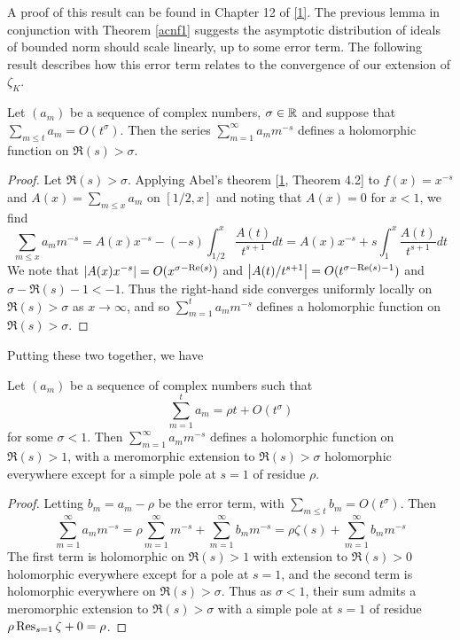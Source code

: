 \documentclass[11pt]{report}
\begin{document}
A proof of this result can be found in Chapter 12 of \hyperlink{apostol}{[1]}. The previous lemma in conjunction with Theorem \ref{acnf1} suggests the asymptotic distribution of ideals of bounded norm should scale linearly, up to some error term. The following result describes how this error term relates to the convergence of our extension of $\zeta_K$.
\begin{lemma}
    Let $(a_m)$ be a sequence of complex numbers, $\sigma \in \mathbb{R}$ and suppose that $\sum_{m \leq t} a_m = O(t^\sigma)$. Then the series $\sum_{m = 1}^\infty a_mm^{-s}$ defines a holomorphic function on $\Re(s) > \sigma$.
\end{lemma}
\begin{proof}
    Let $\Re(s) > \sigma$. Applying Abel's theorem [\hyperlink{apostol}{1}, Theorem 4.2] to $f(x) = x^{-s}$ and $A(x) = \sum_{m \leq x}a_m$ on $[1/2, x]$ and noting that $A(x) = 0$ for $x < 1$, we find
    $$
        \sum_{m \leq x}a_mm^{-s} = A(x)x^{-s} - (-s)\int_{1/2}^x \frac{A(t)}{t^{s + 1}}dt = A(x)x^{-s} + s\int_1^x\frac{A(t)}{t^{s + 1}}dt
    $$
    We note that $\left| A(x)x^{-s} \right| = O(x^{\sigma - \text{Re}(s)})$ and $\left| A(t)/t^{s + 1} \right| = O(t^{\sigma - \text{Re}(s) - 1})$ and $\sigma - \Re(s) - 1 < -1$. Thus the right-hand side converges uniformly locally on $\Re(s) > \sigma$ as $x \to \infty$, and so $\sum_{m = 1}^t a_mm^{-s}$ defines a holomorphic function on $\Re(s) > \sigma$.
\end{proof}
Putting these two together, we have
\begin{lemma}\label{growthrate}
    Let $(a_m)$ be a sequence of complex numbers such that
    $$
        \sum_{m = 1}^t a_m = \rho t + O(t^\sigma)
    $$
    for some $\sigma < 1$. Then $\sum_{m = 1}^\infty a_mm^{-s}$ defines a holomorphic function on $\Re(s) > 1$, with a meromorphic extension to $\Re(s) > \sigma$ holomorphic everywhere except for a simple pole at $s = 1$ of residue $\rho$.
\end{lemma}
\begin{proof}
    Letting $b_m = a_m - \rho$ be the error term, with $\sum_{m \leq t} b_m = O(t^\sigma)$. Then
    $$
        \sum_{m = 1}^\infty a_mm^{-s} = \rho\sum_{m = 1}^\infty m^{-s} + \sum_{m = 1}^\infty b_mm^{-s} = \rho\zeta(s) + \sum_{m = 1}^\infty b_mm^{-s}
    $$
    The first term is holomorphic on $\Re(s) > 1$ with extension to $\Re(s) > 0$ holomorphic everywhere except for a pole at $s = 1$, and the second term is holomorphic everywhere on $\Re(s) > \sigma$. Thus as $\sigma < 1$, their sum admits a meromorphic extension to $\Re(s) > \sigma$ with a simple pole at $s = 1$ of residue $\rho \operatorname{Res}_{s = 1}\zeta + 0 = \rho$.
\end{proof}
\end{document}
